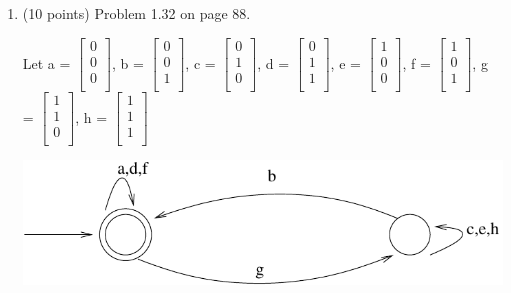 \documentclass[11pt]{article}
\begin{document}
\begin{enumerate}
  \item(10 points) Problem 1.32 on page 88. \\
  \begin{center}
    Let a = $\begin{bmatrix} 0 \\ 0 \\ 0 \\ \end{bmatrix}$, b = $\begin{bmatrix} 0 \\ 0 \\ 1 \\ \end{bmatrix}$,
    c = $\begin{bmatrix} 0 \\ 1 \\ 0 \\ \end{bmatrix}$, d = $\begin{bmatrix} 0 \\ 1 \\ 1 \\ \end{bmatrix}$,
    e = $\begin{bmatrix} 1 \\ 0 \\ 0 \\ \end{bmatrix}$, f = $\begin{bmatrix} 1 \\ 0 \\ 1 \\ \end{bmatrix}$,
    g = $\begin{bmatrix} 1 \\ 1 \\ 0 \\ \end{bmatrix}$, h = $\begin{bmatrix} 1 \\ 1 \\ 1 \\ \end{bmatrix}$ \\
  \end{center}
  \begin{center}
    \includegraphics[scale=.4] {fig5.pdf}
  \end{center} 


\end{enumerate}
\end{document}
